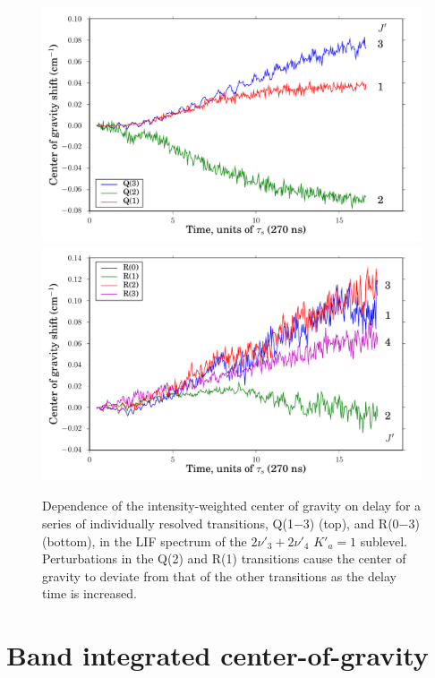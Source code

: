 \documentclass[12pt]{mitthesis}
\begin{document}
\begin{figure}
  \caption{Dependence of the intensity-weighted center of gravity on
    delay for a series of individually resolved transitions, Q(1$-$3)
    (top), and R(0$-$3) (bottom), in the LIF spectrum of the
    $2\nu'_3+2\nu'_4$ $K'_a\!=\!1$ sublevel.  Perturbations in the
    Q(2) and R(1) transitions cause the center of gravity to deviate
    from that of the other transitions as the delay time is increased.}
  \label{fig:32b2-cog-delay}
  \centering
  \vspace{5mm}
  \includegraphics[width=6in]{32b2-q123-cog-delay.pdf}
  \includegraphics[width=6in]{32b2-r0123-cog-delay.pdf}
\end{figure}

\section{Band integrated center-of-gravity}
\end{document}
